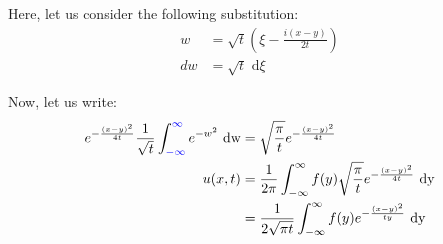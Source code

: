\begin{enumerate}
  Here, let us consider the following substitution:
  \color{blue}
  \begin{align}
    w & = \sqrt t \left( \xi - \frac{i(x - y)}{2t}\right)\\
    dw & = \sqrt t \text{ d}\xi
  \end{align}
  \color{black}

  Now, let us write:
  \begin{align}
    e^{- \frac{(x - y)^2}{4t}} \frac{1}{\sqrt t} \int^{\textcolor{blue}{\infty}}_{\textcolor{blue}{-\infty}} e^{-w^2} \text{ dw}
    & = \sqrt{\frac{\pi}{t}} e^{- \frac{(x - y)^2}{4t}}\\
    u(x, t) & = \frac{1}{2 \pi} \int^\infty_{- \infty} f(y) \sqrt{\frac{\pi}{t}} e^{- \frac{(x - y)^2}{4t}} \text{ dy}\\
    & = \frac{1}{2 \sqrt{\pi t}} \int^\infty_{-\infty} f(y) e^{- \frac{(x - y)^2}{ty}} \text{ dy}
  \end{align}
\end{enumerate}
